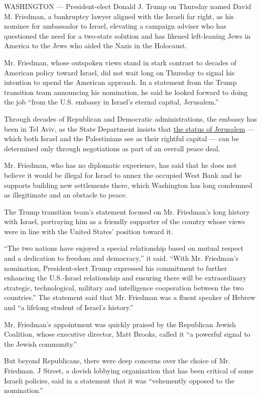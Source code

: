WASHINGTON --- President-elect Donald J. Trump on Thursday named David
M. Friedman, a bankruptcy lawyer aligned with the Israeli far right, as
his nominee for ambassador to Israel, elevating a campaign adviser who
has questioned the need for a two-state solution and has likened
left-leaning Jews in America to the Jews who aided the Nazis in the
Holocaust.

Mr. Friedman, whose outspoken views stand in stark contrast to decades
of American policy toward Israel, did not wait long on Thursday to
signal his intention to upend the American approach. In a statement from
the Trump transition team announcing his nomination, he said he looked
forward to doing the job ``from the U.S. embassy in Israel's eternal
capital, Jerusalem.''

Through decades of Republican and Democratic administrations, the
embassy has been in Tel Aviv, as the State Department insists that
\href{https://www.nytimes.com/2016/11/19/world/middleeast/jerusalem-us-embassy-trump.html}{the
status of Jerusalem} --- which both Israel and the Palestinians see as
their rightful capital --- can be determined only through negotiations
as part of an overall peace deal.

Mr. Friedman, who has no diplomatic experience, has said that he does
not believe it would be illegal for Israel to annex the occupied West
Bank and he supports building new settlements there, which Washington
has long condemned as illegitimate and an obstacle to peace.

The Trump transition team's statement focused on Mr. Friedman's long
history with Israel, portraying him as a friendly supporter of the
country whose views were in line with the United States' position toward
it.

``The two nations have enjoyed a special relationship based on mutual
respect and a dedication to freedom and democracy,'' it said. ``With Mr.
Friedman's nomination, President-elect Trump expressed his commitment to
further enhancing the U.S.-Israel relationship and ensuring there will
be extraordinary strategic, technological, military and intelligence
cooperation between the two countries.'' The statement said that Mr.
Friedman was a fluent speaker of Hebrew and ``a lifelong student of
Israel's history.''

Mr. Friedman's appointment was quickly praised by the Republican Jewish
Coalition, whose executive director, Matt Brooks, called it ``a powerful
signal to the Jewish community.''

But beyond Republicans, there were deep concerns over the choice of Mr.
Friedman. J Street, a dovish lobbying organization that has been
critical of some Israeli policies, said in a statement that it was
``vehemently opposed to the nomination.''

